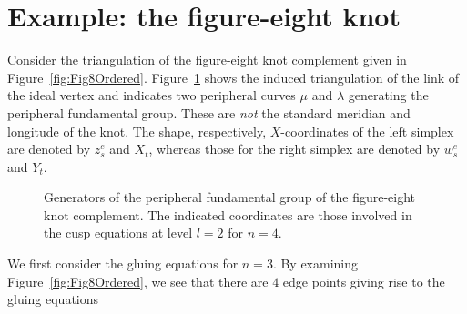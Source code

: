 \documentclass[12pt]{amsart}
\theoremstyle{definition}
\numberwithin{equation}{section}
\def\sgn{\mathrm{sgn}}
\begin{document}











\section{Example: the figure-eight knot}\label{sec:Example}

Consider the triangulation of the figure-eight knot complement given in Figure~\ref{fig:Fig8Ordered}. Figure~\ref{fig:Figure8Cusp} shows the induced triangulation of the link of the ideal vertex and indicates two peripheral curves $\mu$ and $\lambda$ generating the peripheral fundamental group. These are \emph{not} the standard meridian and longitude of the knot. The shape, respectively, $X$-coordinates of the left simplex are denoted by $z^e_s$ and $X_t$, whereas those for the right simplex are denoted by $w_s^e$ and $Y_t$.

\begin{figure}[htb]
\begin{center}
\scalebox{0.85}{
}
\end{center}
\caption{Generators of the peripheral fundamental group of the figure-eight knot complement. The indicated coordinates are those involved in the cusp equations at level $l=2$ for $n=4$.}\label{fig:Figure8Cusp}
\end{figure}

We first consider the gluing equations for $n=3$. By examining Figure~\ref{fig:Fig8Ordered}, we see that there are $4$ edge points giving rise to the gluing equations
\end{document}
